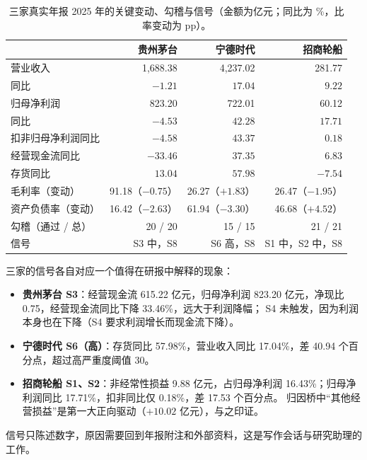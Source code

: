\begin{table}[t]
\centering
\caption{三家真实年报 2025 年的关键变动、勾稽与信号（金额为亿元；同比为 \%，比率变动为 pp）。}
\label{tab:an-real}
\small
\begin{tabular}{lrrr}
\toprule
 & 贵州茅台 & 宁德时代 & 招商轮船 \\
\midrule
营业收入 & 1,688.38 & 4,237.02 & 281.77 \\
\quad 同比 & $-1.21$ & $17.04$ & $9.22$ \\
归母净利润 & 823.20 & 722.01 & 60.12 \\
\quad 同比 & $-4.53$ & $42.28$ & $17.71$ \\
扣非归母净利润同比 & $-4.58$ & $43.37$ & $0.18$ \\
经营现金流同比 & $-33.46$ & $37.35$ & $6.83$ \\
存货同比 & $13.04$ & $57.98$ & $-7.54$ \\
毛利率（变动） & 91.18（$-0.75$） & 26.27（$+1.83$） & 26.47（$-1.95$） \\
资产负债率（变动） & 16.42（$-2.63$） & 61.94（$-3.30$） & 46.68（$+4.52$） \\
\midrule
勾稽（通过 / 总） & 20 / 20 & 15 / 15 & 21 / 21 \\
信号 & S3 中，S8 & S6 高，S8 & S1 中，S2 中，S8 \\
\bottomrule
\end{tabular}
\end{table}

三家的信号各自对应一个值得在研报中解释的现象：
\begin{itemize}
\item \textbf{贵州茅台 S3}：经营现金流 615.22 亿元，归母净利润 823.20 亿元，净现比 0.75，经营现金流同比下降 33.46\%，远大于利润降幅；
      S4 未触发，因为利润本身也在下降（S4 要求利润增长而现金流下降）。
\item \textbf{宁德时代 S6（高）}：存货同比 57.98\%，营业收入同比 17.04\%，差 40.94 个百分点，超过高严重度阈值 30。
\item \textbf{招商轮船 S1、S2}：非经常性损益 9.88 亿元，占归母净利润 16.43\%；归母净利润同比 17.71\%，扣非同比仅 0.18\%，差 17.53 个百分点。
      归因桥中“其他经营损益”是第一大正向驱动（$+10.02$ 亿元），与之印证。
\end{itemize}
信号只陈述数字，原因需要回到年报附注和外部资料，这是写作会话与研究助理的工作。

